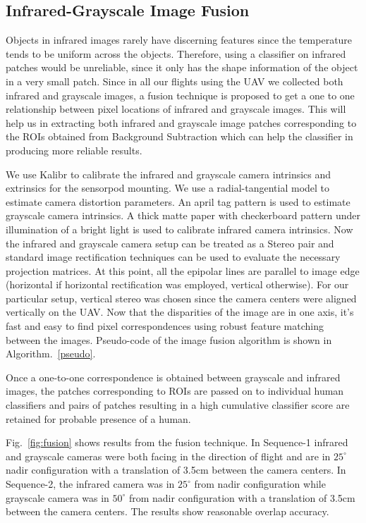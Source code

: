 \documentclass[runningheads]{llncs}
\begin{document}
\subsection{Infrared-Grayscale Image Fusion} 

Objects in infrared images rarely have discerning features since the temperature tends to be uniform across the objects. Therefore, using a classifier on infrared patches would be unreliable, since it only has the shape information of the object in a very small patch. Since in all our flights using the UAV we collected both infrared and grayscale images, a fusion technique is proposed to get a one to one relationship between pixel locations of infrared and grayscale images. This will help us in extracting both infrared and grayscale image patches corresponding to the ROIs obtained from Background Subtraction which can help the classifier in producing more reliable results.

We use Kalibr \cite{furgale2013unified} to calibrate the infrared and grayscale camera intrinsics and extrinsics for the sensorpod mounting. We use a radial-tangential model to estimate camera distortion parameters. An april tag pattern is used to estimate grayscale camera intrinsics. A thick matte paper with checkerboard pattern under illumination of a bright light is used to calibrate infrared camera intrinsics. Now the infrared and grayscale camera setup can be treated as a Stereo pair and standard image rectification techniques \cite{planar_rect} can be used to evaluate the necessary projection matrices. At this point, all the epipolar lines are parallel to image edge (horizontal if horizontal rectification was employed, vertical otherwise). For our particular setup, vertical stereo was chosen since the camera centers were aligned vertically on the UAV. Now that the disparities of the image are in one axis, it's fast and easy to find pixel correspondences using robust feature matching between the images. Pseudo-code of the image fusion algorithm is shown in Algorithm.~\ref{pseudo}.

Once a one-to-one correspondence is obtained between grayscale and infrared images, the patches corresponding to ROIs are passed on to individual human classifiers and pairs of patches resulting in a high cumulative classifier score are retained for probable presence of a human.


Fig.~\ref{fig:fusion} shows results from the fusion technique. In Sequence-1 infrared and grayscale cameras were both facing in the direction of flight and are in $25^{\circ}$ nadir configuration with a translation of 3.5cm between the camera centers. In Sequence-2, the infrared camera was in $25^{\circ}$ from nadir configuration while grayscale camera was in $50^{\circ}$ from nadir configuration with a translation of 3.5cm between the camera centers. The results show reasonable overlap accuracy.
\end{document}
